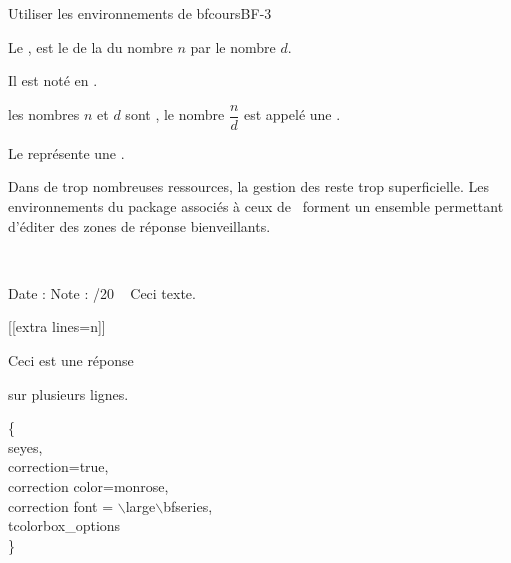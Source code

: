 \begin{EXO}{Utiliser les environnements de bfcours}{BF-3}
\begin{Definition}[Fraction]
\begin{tcbraster}[
            blank,
            raster columns=3, 
            raster equal height, 
            raster width=0.99\textwidth
        ]
\begin{tcolorbox}[blank,raster multicolumn=2]
            Le , est le  de la  du nombre $n$ par le nombre $d$.
            

            Il est noté en  .

            \Si les nombres $n$ et $d$ sont , \Alors le nombre $\dfrac{n}{d}$ est appelé une .
        \end{tcolorbox}
        \begin{tcolorbox}[blank, valign=center]
            \bclampe Le  représente une .
        \end{tcolorbox}
        \end{tcbraster}
    
    \end{Definition}
\end{EXO}  
\begin{Methode}
    Dans de trop nombreuses ressources, la gestion des  reste trop superficielle. 
    Les environnements du package  associés à ceux de \bfcours\ forment un ensemble permettant d'éditer des zones de réponse bienveillants.
    \begin{tcbenumerate}[2]
        \tcbitem  {}\ 

        
        Date :  Note : /20
        \tcbitem  {}\ 
        Ceci  texte.

        \tcbitem  {}[[extra lines=n]]\ 
        \begin{crep}
        Ceci est une réponse

        sur plusieurs lignes. 
        \end{crep}
        \tcbitem {}%
         \{\\
            \phantom{AAAA}seyes, \\
            \phantom{AAAA}correction=true, \\
            \phantom{AAAA}correction color=monrose, \\
            \phantom{AAAA}correction font = $\backslash$large$\backslash$bfseries,\\
            \phantom{AAAA}tcolorbox\_options \\
        \} 
    \end{tcbenumerate}
\end{Methode}

